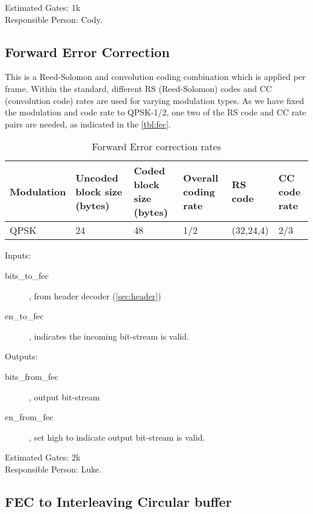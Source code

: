 \documentclass[dvips,10pt,twocolumn]{article}
\begin{document}
	Estimated Gates: 1k \\
	Responsible Person: Cody.

	\subsection{Forward Error Correction}
	\label{sec:fec}
	This is a Reed-Solomon and convolution coding combination
	which is applied per frame. Within the standard, different
	RS (Reed-Solomon) codes and CC (convolution code) rates are
	used for varying modulation types. As we have fixed the
	modulation and code rate to QPSK-1/2, one two of the RS
	code and CC rate pairs are needed, as indicated in the
	\autoref{tbl:fec}.
	
	\begin{table*}
		\begin{tabularx}{\textwidth}{X|X|X|X|X|X}
		\label{tbl:fec}
			Modulation & Uncoded block size (bytes) &
			Coded block size (bytes) & Overall coding
			rate & RS code & CC code rate \\ \hline
			QPSK & 24 & 48 & 1/2 & (32,24,4) & 2/3 \\
		\end{tabularx}
		\caption{Forward Error correction rates}
	\end{table*}

	\begin{description}
		\item{Inputs:} \begin{description}
			\item[bits\_to\_fec], from header decoder
				(\autoref{sec:header})
			\item[en\_to\_fec], indicates the incoming
				bit-stream is valid.
		\end{description}
		\item{Outputs:} \begin{description}
			\item[bits\_from\_fec], output bit-stream
			\item[en\_from\_fec], set high to indicate
				output bit-stream is valid.
		\end{description}
	\end{description}

	Estimated Gates: 2k \\
	Responsible Person: Luke.

	\subsection{FEC to Interleaving Circular buffer}
	\label{sec:fec_buffer}
\end{document}
